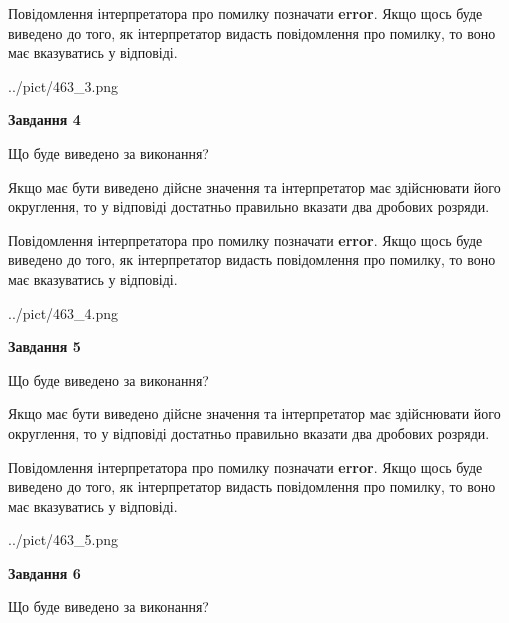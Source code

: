 \documentclass[12pt, ukrainian]{article}
\begin{document}
{\begin {Large}
Повідомлення інтерпретатора про помилку позначати \textbf{error}.
Якщо щось буде виведено до того, як інтерпретатор видасть повідомлення про помилку, 
то воно має вказуватись у відповіді. \par

\begin{center}
	{../pict/463_3.png}
\end{center}
\newpage

{\begin {center}\textbf{Завдання 4}\end {center}}\par
Що буде виведено за виконання? \par

Якщо має бути виведено дійсне значення та інтерпретатор має здійснювати його округлення, 
то у відповіді достатньо правильно вказати два дробових розряди.

Повідомлення інтерпретатора про помилку позначати \textbf{error}.
Якщо щось буде виведено до того, як інтерпретатор видасть повідомлення про помилку, 
то воно має вказуватись у відповіді. \par

\begin{center}
	{../pict/463_4.png}
\end{center}
\newpage

{\begin {center}\textbf{Завдання 5}\end {center}}\par
Що буде виведено за виконання? \par

Якщо має бути виведено дійсне значення та інтерпретатор має здійснювати його округлення, 
то у відповіді достатньо правильно вказати два дробових розряди.

Повідомлення інтерпретатора про помилку позначати \textbf{error}.
Якщо щось буде виведено до того, як інтерпретатор видасть повідомлення про помилку, 
то воно має вказуватись у відповіді. \par

\begin{center}
	{../pict/463_5.png}
\end{center}
\newpage

{\begin {center}\textbf{Завдання 6}\end {center}}\par
Що буде виведено за виконання? \par


\end{Large}}
\end{document}
